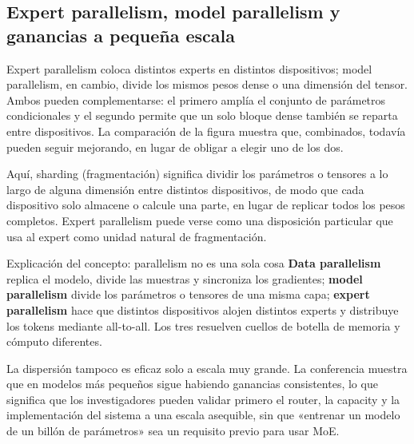 \subsection{Expert parallelism, model parallelism y ganancias a pequeña escala}

Expert parallelism coloca distintos experts en distintos dispositivos; model parallelism, en cambio, divide los mismos pesos dense o una dimensión del tensor. Ambos pueden complementarse: el primero amplía el conjunto de parámetros condicionales y el segundo permite que un solo bloque dense también se reparta entre dispositivos. La comparación de la figura muestra que, combinados, todavía pueden seguir mejorando, en lugar de obligar a elegir uno de los dos.

Aquí, sharding (fragmentación) significa dividir los parámetros o tensores a lo largo de alguna dimensión entre distintos dispositivos, de modo que cada dispositivo solo almacene o calcule una parte, en lugar de replicar todos los pesos completos. Expert parallelism puede verse como una disposición particular que usa al expert como unidad natural de fragmentación.


\begin{knowledgebox}{Explicación del concepto: parallelism no es una sola cosa}
\textbf{Data parallelism} replica el modelo, divide las muestras y sincroniza los gradientes; \textbf{model parallelism} divide los parámetros o tensores de una misma capa; \textbf{expert parallelism} hace que distintos dispositivos alojen distintos experts y distribuye los tokens mediante all-to-all. Los tres resuelven cuellos de botella de memoria y cómputo diferentes.
\end{knowledgebox}

La dispersión tampoco es eficaz solo a escala muy grande. La conferencia muestra que en modelos más pequeños sigue habiendo ganancias consistentes, lo que significa que los investigadores pueden validar primero el router, la capacity y la implementación del sistema a una escala asequible, sin que «entrenar un modelo de un billón de parámetros» sea un requisito previo para usar MoE.


